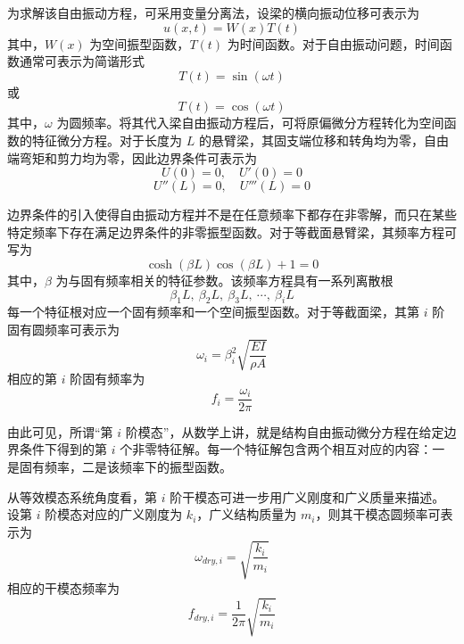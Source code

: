 为求解该自由振动方程，可采用变量分离法，设梁的横向振动位移可表示为
\begin{equation}
  u(x,t)=W(x)T(t)
\end{equation}
其中，$W(x)$ 为空间振型函数，$T(t)$ 为时间函数。对于自由振动问题，时间函数通常可表示为简谐形式
\begin{equation}
  T(t)=\sin(\omega t)
\end{equation}
或
\begin{equation}
  T(t)=\cos(\omega t)
\end{equation}
其中，$\omega$ 为圆频率。将其代入梁自由振动方程后，可将原偏微分方程转化为空间函数的特征微分方程。对于长度为 $L$ 的悬臂梁，其固支端位移和转角均为零，自由端弯矩和剪力均为零，因此边界条件可表示为
\begin{equation}
  U(0)=0,\quad U'(0)=0
\end{equation}
\begin{equation}
  U''(L)=0,\quad U'''(L)=0
\end{equation}

边界条件的引入使得自由振动方程并不是在任意频率下都存在非零解，而只在某些特定频率下存在满足边界条件的非零振型函数。对于等截面悬臂梁，其频率方程可写为
\begin{equation}
  \cosh(\beta L)\cos(\beta L)+1=0
\end{equation}
其中，$\beta$ 为与固有频率相关的特征参数。该频率方程具有一系列离散根
\begin{equation}
  \beta_1L,\ \beta_2L,\ \beta_3L,\ \cdots,\ \beta_iL
\end{equation}
每一个特征根对应一个固有频率和一个空间振型函数。对于等截面梁，其第 $i$ 阶固有圆频率可表示为
\begin{equation}
  \omega_i=\beta_i^2\sqrt{\frac{EI}{\rho A}}
\end{equation}
相应的第 $i$ 阶固有频率为
\begin{equation}
  f_i=\frac{\omega_i}{2\pi}
\end{equation}

由此可见，所谓“第 $i$ 阶模态”，从数学上讲，就是结构自由振动微分方程在给定边界条件下得到的第 $i$ 个非零特征解。每一个特征解包含两个相互对应的内容：一是固有频率，二是该频率下的振型函数。

从等效模态系统角度看，第 $i$ 阶干模态可进一步用广义刚度和广义质量来描述。设第 $i$ 阶模态对应的广义刚度为 $k_i$，广义结构质量为 $m_i$，则其干模态圆频率可表示为
\begin{equation}
  \omega_{dry,i}=\sqrt{\frac{k_i}{m_i}}
\end{equation}
相应的干模态频率为
\begin{equation}
  f_{dry,i}=\frac{1}{2\pi}\sqrt{\frac{k_i}{m_i}}
\end{equation}

